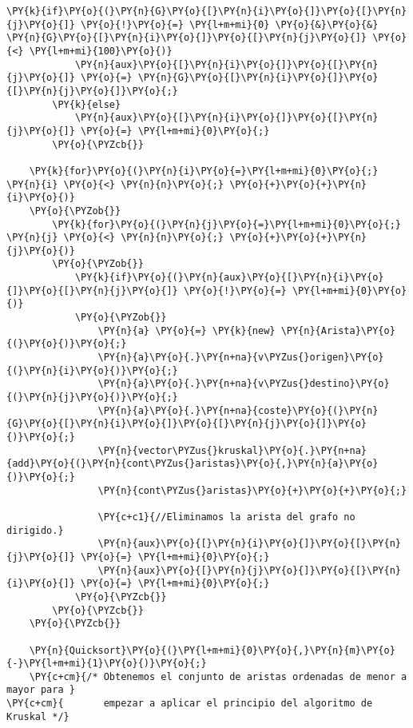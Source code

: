 \begin{Verbatim}[commandchars=\\\{\}]
		\PY{k}{if}\PY{o}{(}\PY{n}{G}\PY{o}{[}\PY{n}{i}\PY{o}{]}\PY{o}{[}\PY{n}{j}\PY{o}{]} \PY{o}{!}\PY{o}{=} \PY{l+m+mi}{0} \PY{o}{&}\PY{o}{&} \PY{n}{G}\PY{o}{[}\PY{n}{i}\PY{o}{]}\PY{o}{[}\PY{n}{j}\PY{o}{]} \PY{o}{<} \PY{l+m+mi}{100}\PY{o}{)}
		    \PY{n}{aux}\PY{o}{[}\PY{n}{i}\PY{o}{]}\PY{o}{[}\PY{n}{j}\PY{o}{]} \PY{o}{=} \PY{n}{G}\PY{o}{[}\PY{n}{i}\PY{o}{]}\PY{o}{[}\PY{n}{j}\PY{o}{]}\PY{o}{;}
		\PY{k}{else}
		    \PY{n}{aux}\PY{o}{[}\PY{n}{i}\PY{o}{]}\PY{o}{[}\PY{n}{j}\PY{o}{]} \PY{o}{=} \PY{l+m+mi}{0}\PY{o}{;}
	    \PY{o}{\PYZcb{}}

    \PY{k}{for}\PY{o}{(}\PY{n}{i}\PY{o}{=}\PY{l+m+mi}{0}\PY{o}{;} \PY{n}{i} \PY{o}{<} \PY{n}{n}\PY{o}{;} \PY{o}{+}\PY{o}{+}\PY{n}{i}\PY{o}{)}
	\PY{o}{\PYZob{}}
	    \PY{k}{for}\PY{o}{(}\PY{n}{j}\PY{o}{=}\PY{l+m+mi}{0}\PY{o}{;} \PY{n}{j} \PY{o}{<} \PY{n}{n}\PY{o}{;} \PY{o}{+}\PY{o}{+}\PY{n}{j}\PY{o}{)}
		\PY{o}{\PYZob{}}
		    \PY{k}{if}\PY{o}{(}\PY{n}{aux}\PY{o}{[}\PY{n}{i}\PY{o}{]}\PY{o}{[}\PY{n}{j}\PY{o}{]} \PY{o}{!}\PY{o}{=} \PY{l+m+mi}{0}\PY{o}{)}
			\PY{o}{\PYZob{}}
			    \PY{n}{a} \PY{o}{=} \PY{k}{new} \PY{n}{Arista}\PY{o}{(}\PY{o}{)}\PY{o}{;}
			    \PY{n}{a}\PY{o}{.}\PY{n+na}{v\PYZus{}origen}\PY{o}{(}\PY{n}{i}\PY{o}{)}\PY{o}{;}
			    \PY{n}{a}\PY{o}{.}\PY{n+na}{v\PYZus{}destino}\PY{o}{(}\PY{n}{j}\PY{o}{)}\PY{o}{;}
			    \PY{n}{a}\PY{o}{.}\PY{n+na}{coste}\PY{o}{(}\PY{n}{G}\PY{o}{[}\PY{n}{i}\PY{o}{]}\PY{o}{[}\PY{n}{j}\PY{o}{]}\PY{o}{)}\PY{o}{;}
			    \PY{n}{vector\PYZus{}kruskal}\PY{o}{.}\PY{n+na}{add}\PY{o}{(}\PY{n}{cont\PYZus{}aristas}\PY{o}{,}\PY{n}{a}\PY{o}{)}\PY{o}{;}
			    \PY{n}{cont\PYZus{}aristas}\PY{o}{+}\PY{o}{+}\PY{o}{;}
				
			    \PY{c+c1}{//Eliminamos la arista del grafo no dirigido.}
			    \PY{n}{aux}\PY{o}{[}\PY{n}{i}\PY{o}{]}\PY{o}{[}\PY{n}{j}\PY{o}{]} \PY{o}{=} \PY{l+m+mi}{0}\PY{o}{;}
			    \PY{n}{aux}\PY{o}{[}\PY{n}{j}\PY{o}{]}\PY{o}{[}\PY{n}{i}\PY{o}{]} \PY{o}{=} \PY{l+m+mi}{0}\PY{o}{;}
			\PY{o}{\PYZcb{}}
		\PY{o}{\PYZcb{}}
	\PY{o}{\PYZcb{}}

    \PY{n}{Quicksort}\PY{o}{(}\PY{l+m+mi}{0}\PY{o}{,}\PY{n}{m}\PY{o}{-}\PY{l+m+mi}{1}\PY{o}{)}\PY{o}{;}
    \PY{c+cm}{/* Obtenemos el conjunto de aristas ordenadas de menor a mayor para }
\PY{c+cm}{       empezar a aplicar el principio del algoritmo de Kruskal */}



\end{Verbatim}

